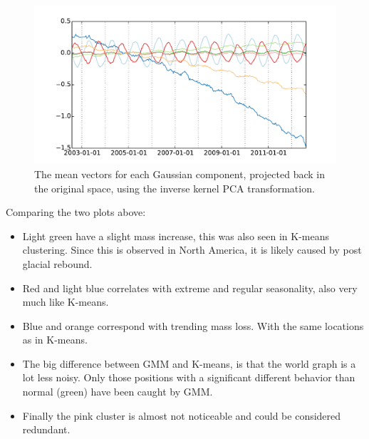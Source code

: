 \begin{figure}[H]
	\center
	\includegraphics[width=\textwidth]{figures/gmm-centroids}
	\caption{The mean vectors for each Gaussian component, projected back in the original space, using the inverse kernel PCA transformation.}
\end{figure}

Comparing the two plots above:
\begin{itemize}
	\item Light green have a slight mass increase, this was also seen in K-means clustering. Since this is observed in North America, it is likely caused by post glacial rebound.
	\item  Red and light blue correlates with extreme and regular seasonality, also very much like K-means.
	\item Blue and orange correspond with trending mass loss. With the same locations as in K-means.
	\item The big difference between GMM and K-means, is that the world graph is a lot less noisy. Only those positions with a significant different behavior than normal (green) have been caught by GMM.
	\item Finally the pink cluster is almost not noticeable and could be considered redundant. 
\end{itemize}
